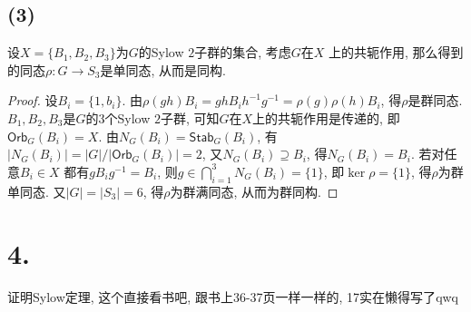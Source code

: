 \documentclass[12pt, a4paper, fontset=windows]{ctexart}
\newcommand{\Orb}{\mathsf{Orb}}
\newcommand{\Stab}{\mathsf{Stab}}
\newcommand{\abs}[1]{\left|{#1}\right|}
\begin{document}
\subsection*{(3)}

设$X=\{B_1,B_2,B_3\}$为$G$的Sylow $2$子群的集合, 考虑$G$在$X$
上的共轭作用, 那么得到的同态$\rho:G\to S_3$是单同态, 从而是同构. 

\begin{proof}
设$B_i=\{1,b_i\}$. 
由$\rho(gh)B_i=ghB_ih^{-1}g^{-1}=\rho(g)\rho(h)B_i$, 得$\rho$是群同态. 
$B_1,B_2,B_3$是$G$的$3$个Sylow $2$子群, 可知$G$在$X$上的共轭作用是传递的, 即$\Orb_{G}(B_i)=X$. 
由$N_G(B_i)=\Stab_{G}(B_i)$, 有$\abs{N_G(B_i)}=\abs{G}/\abs{\Orb_{G}(B_i)}=2$, 
又$N_G(B_i)\supseteq B_i$, 得$N_G(B_i)=B_i$. 若对任意$B_i\in X$
都有$gB_ig^{-1}=B_i$, 则$g\in\bigcap^3_{i=1}N_G(B_i)=\{1\}$, 
即$\ker\rho=\{1\}$, 得$\rho$为群单同态. 又$\abs{G}=\abs{S_3}=6$, 
得$\rho$为群满同态, 从而为群同构. 
\end{proof}

\section*{4.}

证明Sylow定理, 这个直接看书吧, 跟书上36-37页\cite{jsds}一样一样的, 17实在懒得写了{\sf qwq}

\clearpage
\end{document}
